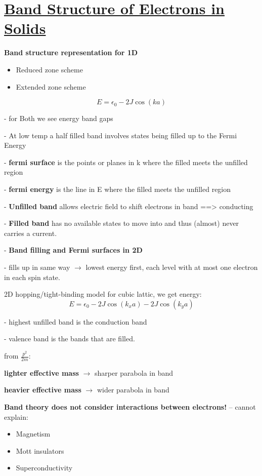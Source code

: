  \section[Band Structure of Electrons in Solids]{\hyperlink{toc}{Band Structure of Electrons in Solids}}



 \textbf{Band structure representation for 1D}
 \begin{itemize}
     \item Reduced zone scheme
     \item Extended zone scheme 
 \end{itemize}

\[E = \epsilon_0 - 2J \cos(ka) \] 

- for Both we see energy band gaps

- At low temp a half filled band involves states being filled up to the Fermi Energy

- \textbf{fermi surface} is the points or planes in k where the filled meets the unfilled region

- \textbf{fermi energy} is the line in E where the filled meets the unfilled region

- \textbf{Unfilled band} allows electric field to shift electrons in band ==> conducting

- \textbf{Filled band} has no available states to move into and thus (almost) never carries a current.

- \textbf{Band filling and Fermi surfaces in 2D}

- fills up in same way $\xrightarrow{}$ lowest energy first, each level with at most one electron in each spin state.

2D hopping/tight-binding model for cubic lattic, we get energy:
\begin{equation}
    E = \epsilon_0 - 2J\cos(k_x a) - 2J \cos(k_y a)
\end{equation}


- highest unfilled band is the conduction band

- valence band is the bands that are filled.

from $\frac{p^2}{2m}$:

\textbf{lighter effective mass} $\xrightarrow{}$ sharper parabola in band

\textbf{heavier effective mass} $\xrightarrow{}$ wider parabola in band 

\textbf{Band theory does not consider interactions between electrons!} -- cannot explain:
\begin{itemize}
    \item Magnetism
    \item Mott insulators
    \item Superconductivity
\end{itemize}

